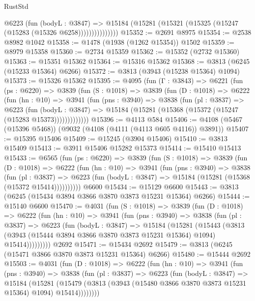 \begin{lexlean}{RustStd}
\begin{coremodule}
                  @6223
                    (fun (bodyL : @3847) =>
                    @15184 (@15281 (@15321 (@15325 (@15247 (@15283 (@15326 @6258)))))))))))))))
@15352 := @2691 @8975
@15354 := @2538 @8982 @1042
@15358 := @1478 (@1938 (@1262 @15354)) @1502
@15359 := @8979 @15358
@15360 := @2734 @15359
@15362 := @15352 (@2732 @15360)
@15363 := @15351 @15362
@15364 := @15316 @15362
@15368 := @3813 (@6245 (@15233 @15364) @6266)
@15372 := @3813 (@3943 (@15238 @15364) @1094)
@15373 := @15326 @15362
@15395 := @4095
    (fun (Γ : @3843) =>
    @6221
      (fun (ps : @6220) =>
      @3839
        (fun (S : @1018) =>
        @3839
          (fun (D : @1018) =>
          @6222
            (fun (hn : @10) =>
            @3941
              (fun (pns : @3940) =>
              @3838
                (fun (pl : @3837) =>
                @6223
                  (fun (bodyL : @3847) =>
                  @15184 (@15281 (@15368 (@15372 (@15247 (@15283 @15373)))))))))))))
@15396 := @4113 @584
@15406 := @4108 (@5467 (@15396 @5468)) (@9032 (@4108 (@4111 (@4113 @605 @4116)) @3891))
@15407 := @15395 @15406
@15409 := @15245 (@3904 @15406)
@15410 := @3813 @15409
@15413 := @3911 @15406 @15282 @15373
@15414 := @15410 @15413
@15433 := @6565
    (fun (ps : @6220) =>
    @3839
      (fun (S : @1018) =>
      @3839
        (fun (D : @1018) =>
        @6222
          (fun (hn : @10) =>
          @3941
            (fun (pns : @3940) =>
            @3838
              (fun (pl : @3837) =>
              @6223 (fun (bodyL : @3847) => @15184 (@15281 (@15368 (@15372 @15414))))))))))
    @6600
@15434 := @15129 @6600
@15443 := @3813 (@6245 (@15434 @3894 @3866 @3870 @3873 @15231 @15364) @6266)
@15444 := @15140 @6600
@15470 := @4031
    (fun (S : @1018) =>
    @3839
      (fun (D : @1018) =>
      @6222
        (fun (hn : @10) =>
        @3941
          (fun (pns : @3940) =>
          @3838
            (fun (pl : @3837) =>
            @6223
              (fun (bodyL : @3847) =>
              @15184
                (@15281
                  (@15443
                    (@3813
                      (@3943 (@15444 @3894 @3866 @3870 @3873 @15231 @15364) @1094)
                      @15414)))))))))
    @2692
@15471 := @15434 @2692
@15479 := @3813 (@6245 (@15471 @3866 @3870 @3873 @15231 @15364) @6266)
@15480 := @15444 @2692
@15503 := @4031
    (fun (D : @1018) =>
    @6222
      (fun (hn : @10) =>
      @3941
        (fun (pns : @3940) =>
        @3838
          (fun (pl : @3837) =>
          @6223
            (fun (bodyL : @3847) =>
            @15184
              (@15281
                (@15479 (@3813 (@3943 (@15480 @3866 @3870 @3873 @15231 @15364) @1094) @15414))))))))

\end{coremodule}
\end{lexlean}
